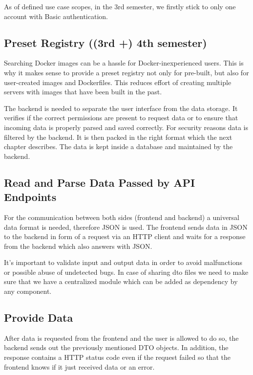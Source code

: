 \documentclass[a4paper,12pt,chapterprefix=false,bibliography=totoc,listof=totoc,]{scrreprt}
\begin{document}
As of defined use case scopes, in the 3rd semester, we firstly stick to only one account with Basic authentication.

\subsection{Preset Registry ((3rd +) 4th semester)}
Searching Docker images can be a hassle for Docker-inexperienced users. This is why it makes sense to provide a preset registry not only for pre-built, but also for user-created images and Dockerfiles. This reduces effort of creating multiple servers with images that have been built in the past.

The backend is needed to separate the user interface from the data storage. It verifies if the correct permissions are present to request data or to ensure that incoming data is properly parsed and saved correctly. For security reasons data is filtered by the backend. It is then packed in the right format which the next chapter describes. The data is kept inside a database and maintained by the backend.


\subsection{Read and Parse Data Passed by API Endpoints}
For the communication between both sides (frontend and backend) a universal data format is needed, therefore JSON is used. The frontend sends data in JSON to the backend in form of a request via an HTTP client and waits for a response from the backend which also answers with JSON.

It's important to validate input and output data in order to avoid malfunctions or possible abuse of undetected bugs. In case of sharing \gls{dto} files we need to make sure that we have a centralized module which can be added as dependency by any component.

\subsection{Provide Data}
After data is requested from the frontend and the user is allowed to do so, the backend sends out the previously mentioned DTO objects. In addition, the response contains a HTTP status code even if the request failed so that the frontend knows if it just received data or an error.
\end{document}
